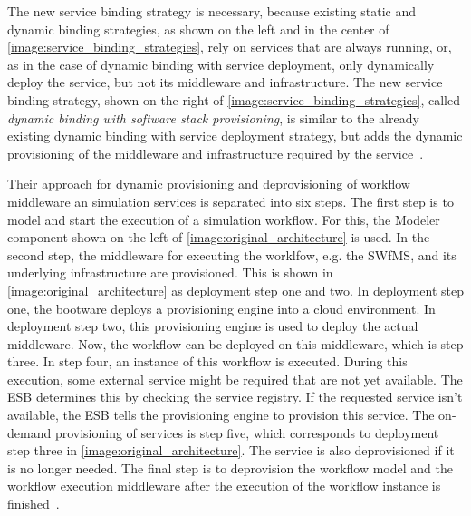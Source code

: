 The new service binding strategy is necessary, because existing static and dynamic binding strategies, as shown on the left and in the center of \autoref{image:service_binding_strategies}, rely on services that are always running, or, as in the case of dynamic binding with service deployment, only dynamically deploy the service, but not its middleware and infrastructure.
The new service binding strategy, shown on the right of \autoref{image:service_binding_strategies}, called \textit{dynamic binding with software stack provisioning}, is similar to the already existing dynamic binding with service deployment strategy, but adds the dynamic provisioning of the middleware and infrastructure required by the service~\autocite{provisioning:ondemand}.

Their approach for dynamic provisioning and deprovisioning of workflow middleware an simulation services is separated into six steps.
The first step is to model and start the execution of a simulation workflow.
For this, the Modeler component shown on the left of \autoref{image:original_architecture} is used.
In the second step, the middleware for executing the worklfow, e.g. the SWfMS, and its underlying infrastructure are provisioned.
This is shown in \autoref{image:original_architecture} as deployment step one and two.
In deployment step one, the bootware deploys a provisioning engine into a cloud environment.
In deployment step two, this provisioning engine is used to deploy the actual middleware.
Now, the workflow can be deployed on this middleware, which is step three.
In step four, an instance of this workflow is executed.
During this execution, some external service might be required that are not yet available.
The ESB determines this by checking the service registry.
If the requested service isn't available, the ESB tells the provisioning engine to provision this service.
The on-demand provisioning of services is step five, which corresponds to deployment step three in \autoref{image:original_architecture}.
The service is also deprovisioned if it is no longer needed.
The final step is to deprovision the workflow model and the workflow execution middleware after the execution of the workflow instance is finished~\autocite{provisioning:ondemand}.

